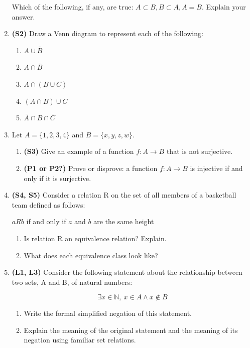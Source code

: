 \documentclass[12pt]{article}
\begin{document}
\begin{enumerate}
Which of the following, if any, are true: $A \subset B, B \subset A, A=B$. Explain your answer.


\item \textbf{(S2)} Draw a Venn diagram to represent each of the following:
\begin{enumerate}
    \item $A\cup \overline{B}$
    \item $A\cap\overline{B}$
    \item $A\cap(B\cup C)$
    \item $(A \cap B) \cup C$
    \item $\overline{A} \cap B \cap \overline{C}$
\end{enumerate}

\item Let $A = \{1,2,3,4\}$ and $B = \{x,y,z,w\}$. 
\begin{enumerate}
    \item \textbf{(S3)} Give an example of a function $f:A\to B$ that is not surjective. 
    
    \item \textbf{(P1 or P2?)} Prove or disprove: a function $f:A\to B$ is injective if and only if it is surjective.
    
\end{enumerate}

\item\textbf{(S4, S5)} Consider a relation R on the set of all members of a basketball team defined as follows:
\begin{center}
  $aRb$  if and only if $a$ and $b$ are the same height  
\end{center}
\begin{enumerate}
    \item Is relation R an equivalence relation? Explain.
    \item What does each equivalence class look like?
\end{enumerate}

\item
\textbf{(L1, L3)} Consider the following statement about the relationship between two sets, A and B, of natural numbers:


        \[\exists x \in \mathbb{N},\ x \in A \land x \not\in B \]
\begin{enumerate}
    \item 
    Write the formal simplified negation of this statement.
    
    \item
    Explain the meaning of the original statement and the meaning of its negation using familiar set relations.
    

\end{enumerate}
\end{enumerate}
\end{document}
